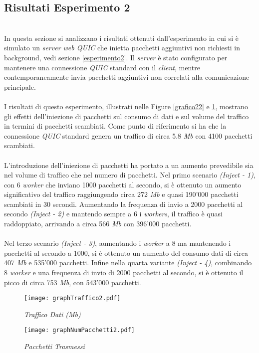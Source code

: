 \subsection{Risultati Esperimento 2}
~\\
\indent In questa sezione si analizzano i risultati ottenuti dall'esperimento in cui si è simulato un \emph{server web QUIC} che inietta pacchetti aggiuntivi non richiesti in background, vedi sezione \ref{esperimento2}.
Il \emph{server} è stato configurato per mantenere una connessione \emph{QUIC} standard con il \emph{client}, mentre contemporaneamente invia pacchetti aggiuntivi non correlati alla comunicazione principale.
\\\\
I risultati di questo esperimento, illustrati nelle Figure \ref{grafico22} e \ref{grafico2}, mostrano gli effetti dell'iniezione di pacchetti sul consumo di dati e sul volume del traffico in termini di pacchetti scambiati.
Come punto di riferimento si ha che la connessione \emph{QUIC} standard genera un traffico di circa 5.8 \emph{Mb} con 4100 pacchetti scambiati.
\\\\
L'introduzione dell'iniezione di pacchetti ha portato a un aumento prevedibile sia nel volume di traffico che nel numero di pacchetti.
Nel primo scenario \emph{(Inject - 1)}, con 6 \emph{worker} che inviano 1000 pacchetti al secondo, si è ottenuto un aumento significativo del traffico raggiungendo circa 272 \emph{Mb} e quasi 190'000 pacchetti scambiati in 30 secondi. 
Aumentando la frequenza di invio a 2000 pacchetti al secondo \emph{(Inject - 2)} e mantendo sempre a 6 i \emph{workers}, il traffico è quasi raddoppiato, arrivando a circa 566 \emph{Mb} con 396'000 pacchetti.
\\\\
Nel terzo scenario \emph{(Inject - 3)}, aumentando i \emph{worker} a 8 ma mantenendo i pacchetti al secondo a 1000, si è ottenuto un aumento del consumo dati di circa 407 \emph{Mb} e 535'000 pacchetti. 
Infine nella quarta variante \emph{(Inject - 4)}, combinando 8 \emph{worker} e una frequenza di invio di 2000 pacchetti al secondo, si è ottenuto il picco di circa 753 \emph{Mb}, con 543'000 pacchetti.
\begin{figure}[!h]
    \centering
    \begin{minipage}{0.48\textwidth}
        \centering
        \texttt{[image: graphTraffico2.pdf]}
        \caption{\emph{Traffico Dati (Mb)}}
        \label{grafico22}
    \end{minipage}
    \hfill
    \begin{minipage}{0.48\textwidth}
        \centering
        \texttt{[image: graphNumPacchetti2.pdf]}
        \caption{\emph{Pacchetti Trasmessi}}
        \label{grafico2}
    \end{minipage}
\end{figure}
